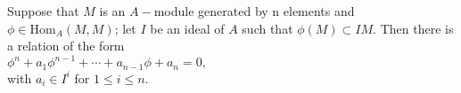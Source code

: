 \begin{thm}[]
    \label{determinanttrick}
    Suppose that $M$ is an $A-$module generated by n elements and $\phi\in\text{Hom}_{A}(M,M)$;
    let $I$ be an ideal of $A$ such that $\phi(M)\subset IM$. Then there is a relation of the form\\
    \hspace*{10mm}$\phi^n+a_1\phi^{n-1}+\cdots+a_{n-1}\phi+a_n=0,$\\
    with $a_i\in I^i$ for $1\leq i\leq n$.
\end{thm}